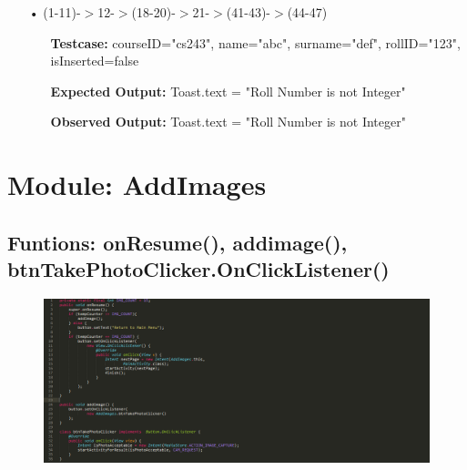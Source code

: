\documentclass{scrreprt}
\begin{document}
\begin{enumerate}
\item[•](1-11)-$>$12-$>$(18-20)-$>$21-$>$(41-43)-$>$(44-47)
\begin{itemize}
\item[]\textbf{Testcase: }courseID="cs243", name="abc", surname="def", rollID="123", isInserted=false
\item[]\textbf{Expected Output: }Toast.text = "Roll Number is not Integer"
\item[]\textbf{Observed Output: }Toast.text = "Roll Number is not Integer"
\end{itemize}

\end{enumerate}	

\section{Module: AddImages}
\subsection{Funtions: onResume(), addimage(), btnTakePhotoClicker.OnClickListener()}
\begin{figure}[H]
\centering
\includegraphics[width=\textwidth, keepaspectratio]{addImagesCode.png}
\end{figure}
\end{document}
